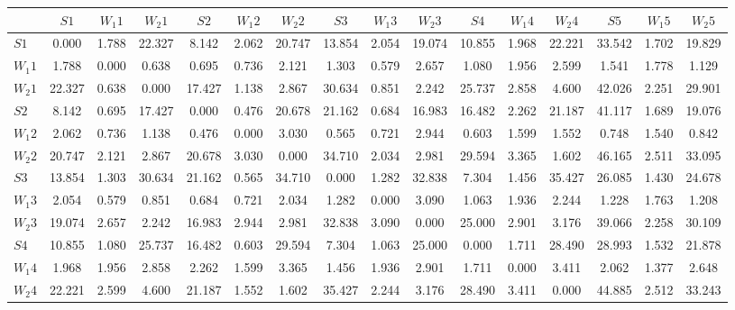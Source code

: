 \begin{table*}[h!]
\begin{center}
\begin{tabular}{| l | c | c | c | c | c | c | c | c | c | c | c | c | c | c | c |}\hline
 & $S1$ & $W_1 1$ & $W_2 1$ & $S2$ & $W_1 2$ & $W_2 2$ & $S3$ & $W_1 3$ & $W_2 3$ & $S4$ & $W_1 4$ & $W_2 4$ & $S5$ & $W_1 5$ & $W_2 5$ \\\hline
$S1$ & 0.000  & 1.788  & 22.327  & 8.142  & 2.062  & 20.747  & 13.854  & 2.054  & 19.074  & 10.855  & 1.968  & 22.221  & 33.542  & 1.702  & 19.829 \\\hline
$W_1 1$ & 1.788  & 0.000  & 0.638  & 0.695  & 0.736  & 2.121  & 1.303  & 0.579  & 2.657  & 1.080  & 1.956  & 2.599  & 1.541  & 1.778  & 1.129 \\\hline
$W_2 1$ & 22.327  & 0.638  & 0.000  & 17.427  & 1.138  & 2.867  & 30.634  & 0.851  & 2.242  & 25.737  & 2.858  & 4.600  & 42.026  & 2.251  & 29.901 \\\hline
$S2$ & 8.142  & 0.695  & 17.427  & 0.000  & 0.476  & 20.678  & 21.162  & 0.684  & 16.983  & 16.482  & 2.262  & 21.187  & 41.117  & 1.689  & 19.076 \\\hline
$W_1 2$ & 2.062  & 0.736  & 1.138  & 0.476  & 0.000  & 3.030  & 0.565  & 0.721  & 2.944  & 0.603  & 1.599  & 1.552  & 0.748  & 1.540  & 0.842 \\\hline
$W_2 2$ & 20.747  & 2.121  & 2.867  & 20.678  & 3.030  & 0.000  & 34.710  & 2.034  & 2.981  & 29.594  & 3.365  & 1.602  & 46.165  & 2.511  & 33.095 \\\hline
$S3$ & 13.854  & 1.303  & 30.634  & 21.162  & 0.565  & 34.710  & 0.000  & 1.282  & 32.838  & 7.304  & 1.456  & 35.427  & 26.085  & 1.430  & 24.678 \\\hline
$W_1 3$ & 2.054  & 0.579  & 0.851  & 0.684  & 0.721  & 2.034  & 1.282  & 0.000  & 3.090  & 1.063  & 1.936  & 2.244  & 1.228  & 1.763  & 1.208 \\\hline
$W_2 3$ & 19.074  & 2.657  & 2.242  & 16.983  & 2.944  & 2.981  & 32.838  & 3.090  & 0.000  & 25.000  & 2.901  & 3.176  & 39.066  & 2.258  & 30.109 \\\hline
$S4$ & 10.855  & 1.080  & 25.737  & 16.482  & 0.603  & 29.594  & 7.304  & 1.063  & 25.000  & 0.000  & 1.711  & 28.490  & 28.993  & 1.532  & 21.878 \\\hline
$W_1 4$ & 1.968  & 1.956  & 2.858  & 2.262  & 1.599  & 3.365  & 1.456  & 1.936  & 2.901  & 1.711  & 0.000  & 3.411  & 2.062  & 1.377  & 2.648 \\\hline
$W_2 4$ & 22.221  & 2.599  & 4.600  & 21.187  & 1.552  & 1.602  & 35.427  & 2.244  & 3.176  & 28.490  & 3.411  & 0.000  & 44.885  & 2.512  & 33.243 \\\hline

\end{tabular}
\end{center}
\end{table*}
